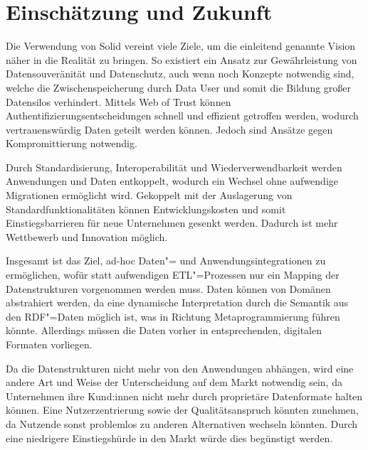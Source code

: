 
\section{Einschätzung und Zukunft}

Die Verwendung von Solid vereint viele Ziele, um die einleitend genannte Vision näher in die Realität zu bringen.
So existiert ein Ansatz zur Gewährleistung von Datensouveränität und Datenschutz, auch wenn noch Konzepte notwendig sind, welche die Zwischenspeicherung durch Data User und somit die Bildung großer Datensilos verhindert.
Mittels Web of Trust können Authentifizierungsentscheidungen schnell und effizient getroffen werden, wodurch vertrauenswürdig Daten geteilt werden können.
Jedoch sind Ansätze gegen Kompromittierung notwendig.

Durch Standardisierung, Interoperabilität und Wiederverwendbarkeit werden Anwendungen und Daten entkoppelt, wodurch ein Wechsel ohne aufwendige Migrationen ermöglicht wird.
Gekoppelt mit der Auslagerung von Standardfunktionalitäten können Entwicklungskosten und somit Einstiegsbarrieren für neue Unternehmen gesenkt werden.
Dadurch ist mehr Wettbewerb und Innovation möglich.

Insgesamt ist das Ziel, ad-hoc Daten"= und Anwendungsintegrationen zu ermöglichen, wofür statt aufwendigen ETL"=Prozessen nur ein Mapping der Datenstrukturen vorgenommen werden muss.
Daten können von Domänen abstrahiert werden, da eine dynamische Interpretation durch die Semantik aus den RDF"=Daten möglich ist, was in Richtung Metaprogrammierung führen könnte.
Allerdings müssen die Daten vorher in entsprechenden, digitalen Formaten vorliegen.

Da die Datenstrukturen nicht mehr von den Anwendungen abhängen, wird eine andere Art und Weise der Unterscheidung auf dem Markt notwendig sein, da Unternehmen ihre Kund:innen nicht mehr durch proprietäre Datenformate halten können.
Eine Nutzerzentrierung sowie der Qualitätsanspruch könnten zunehmen, da Nutzende sonst problemlos zu anderen Alternativen wechseln könnten.
Durch eine niedrigere Einstiegshürde in den Markt würde dies begünstigt werden.
